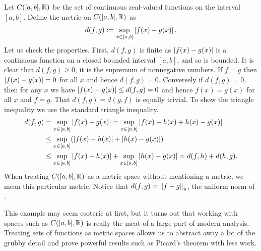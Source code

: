 \begin{example} \label{example:msC01}
Let $C([a,b],{\mathbb{R}})$ be the set of continuous real-valued functions on the
interval $[a,b]$.  Define the metric on $C([a,b],{\mathbb{R}})$ as
\begin{equation*}
d(f,g) := \sup_{x \in [a,b]} \left\lvert {f(x)-g(x)} \right\rvert .
\end{equation*}
Let us check the properties.  First, $d(f,g)$ is finite as
$\left\lvert {f(x)-g(x)} \right\rvert$ is a continuous function on a closed bounded interval
$[a,b]$, and so is bounded.
It is clear that $d(f,g) \geq 0$, 
it is the supremum of nonnegative numbers.  If $f = g$
then $\left\lvert {f(x)-g(x)} \right\rvert = 0$ for all $x$ and hence $d(f,g) = 0$.  Conversely
if $d(f,g) = 0$, then for any $x$ we have $\left\lvert {f(x)-g(x)} \right\rvert \leq d(f,g) = 0$
and hence $f(x) = g(x)$ for all $x$ and $f=g$.  That $d(f,g) = d(g,f)$
is equally trivial.  To show the triangle inequality we use the standard
triangle inequality.
\begin{equation*}
\begin{split}
d(f,g) & =
\sup_{x \in [a,b]} \left\lvert {f(x)-g(x)} \right\rvert =
\sup_{x \in [a,b]} \left\lvert {f(x)-h(x)+h(x)-g(x)} \right\rvert
\\
& \leq
\sup_{x \in [a,b]} ( \left\lvert {f(x)-h(x)} \right\rvert+\left\lvert {h(x)-g(x)} \right\rvert )
\\
& \leq
\sup_{x \in [a,b]} \left\lvert {f(x)-h(x)} \right\rvert+
\sup_{x \in [a,b]} \left\lvert {h(x)-g(x)} \right\rvert = d(f,h) + d(h,g) .
\end{split}
\end{equation*}
When treating $C([a,b],{\mathbb{R}})$ as a metric space without mentioning a metric, we mean this
particular metric.
Notice that $d(f,g) = \left\lVert {f-g} \right\rVert_u$, the uniform norm of .

This example may seem esoteric at first, but it turns out that working with
spaces such as $C([a,b],{\mathbb{R}})$ is really the meat of a large part of modern 
analysis.  Treating sets of functions as metric spaces allows us to
abstract away a lot of the grubby detail and prove powerful results such as
Picard's theorem with less work.
\end{example}

